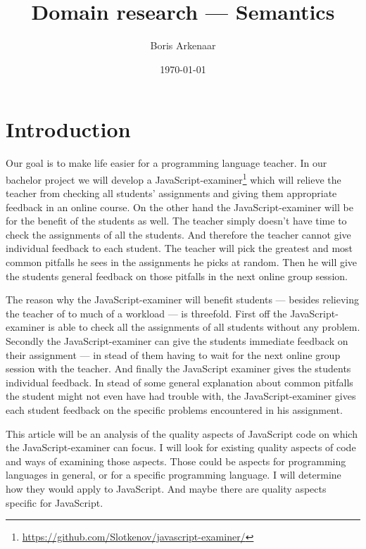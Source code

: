 \documentclass{article}
\begin{document}
 

\title{Domain research --- Semantics}
\author{Boris Arkenaar}
\date{\today}
\maketitle 


\section{Introduction} 

Our goal is to make life easier for a programming language teacher. In our
bachelor project we will develop a
JavaScript-examiner\footnote{\url{https://github.com/Slotkenov/javascript-examiner/}}
which will relieve the teacher from checking all students' assignments and
giving them appropriate feedback in an online course. On the other hand the
JavaScript-examiner will be for the benefit of the students as well. The
teacher simply doesn't have time to check the assignments of all the
students. And therefore the teacher cannot give individual feedback to each
student. The teacher will pick the greatest and most common pitfalls he sees in
the assignments he picks at random. Then he will give the students general
feedback on those pitfalls in the next online group session.

The reason why the JavaScript-examiner will benefit students --- besides
relieving the teacher of to much of a workload --- is threefold. First off the
JavaScript-examiner is able to check all the assignments of all students
without any problem. Secondly the JavaScript-examiner can give the students
immediate feedback on their assignment --- in stead of them having to wait for
the next online group session with the teacher. And finally the JavaScript
examiner gives the students individual feedback. In stead of some general
explanation about common pitfalls the student might not even have had trouble
with, the JavaScript-examiner gives each student feedback on the specific
problems encountered in his assignment.

This article will be an analysis of the quality aspects of JavaScript code on
which the JavaScript-examiner can focus. I will look for existing quality
aspects of code and ways of examining those aspects. Those could be aspects for
programming languages in general, or for a specific programming language. I
will determine how they would apply to JavaScript. And maybe there are quality
aspects specific for JavaScript.
\end{document}
